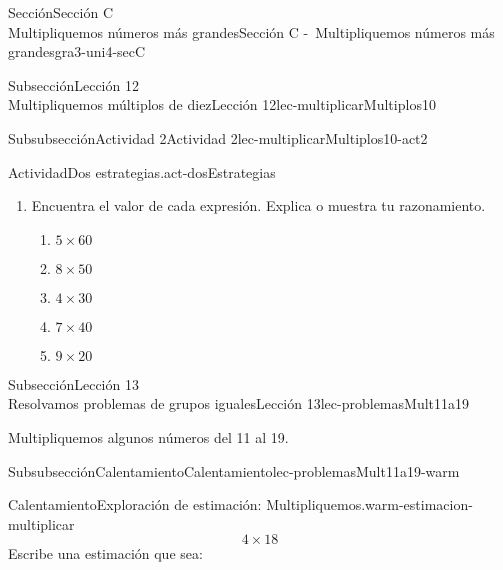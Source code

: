 \begin{sectionptx}{Sección}{{\Large Sección C\\}Multipliquemos números más grandes}{}{Sección C -~Multipliquemos números más grandes}{}{}{gra3-uni4-secC}
\begin{subsectionptx}{Subsección}{{\normalsize Lección 12\\[-0.05cm]}Multipliquemos múltiplos de diez}{}{Lección 12}{}{}{lec-multiplicarMultiplos10}
\begin{subsubsectionptx}{Subsubsección}{Actividad 2}{}{Actividad 2}{}{}{lec-multiplicarMultiplos10-act2}
\begin{activity}{Actividad}{Dos estrategias.}{act-dosEstrategias}
\begin{enumerate}
\begin{itemize}[label=\textbullet]
\item{}Jada contó: 30, 60, 90, 120, 150, 180, 210, 240 y dijo que la respuesta es 240.%
\item{}Kiran dijo que él sabía que \(8\times 3\) es 24, luego encontró \(24\times 10\) y obtuvo 240.%
\end{itemize}
¿En qué se parecen las estrategias de Jada y de Kiran? ¿En qué son diferentes?%
\item{}Encuentra el valor de cada expresión. Explica o muestra tu razonamiento.%
%
\begin{enumerate}
\item{}\(\displaystyle 5 \times 60\)%
\item{}\(\displaystyle 8 \times 50\)%
\item{}\(\displaystyle 4 \times 30\)%
\item{}\(\displaystyle 7 \times 40\)%
\item{}\(\displaystyle 9 \times 20\)%
\end{enumerate}
\end{enumerate}
\end{activity}%
\end{subsubsectionptx}
\end{subsectionptx}
%
%
\typeout{************************************************}
\typeout{************************************************}
%
\clearpage
\begin{subsectionptx}{Subsección}{{\normalsize Lección 13\\[-0.05cm]}Resolvamos problemas de grupos iguales}{}{Lección 13}{}{}{lec-problemasMult11a19}
\begin{introduction}{}%
Multipliquemos algunos números del 11 al 19.%
\end{introduction}%
%
%
\typeout{************************************************}
\typeout{************************************************}
%
\begin{subsubsectionptx}{Subsubsección}{Calentamiento}{}{Calentamiento}{}{}{lec-problemasMult11a19-warm}
\begin{exploration}{Calentamiento}{Exploración de estimación: Multipliquemos.}{warm-estimacion-multiplicar}%
%
\begin{equation*}
4\times 18
\end{equation*}
Escribe una estimación que sea:%
\begin{image}{0}{1}{0}{}%

\end{image}
\end{exploration}
\end{subsubsectionptx}
\end{subsectionptx}
\end{sectionptx}
